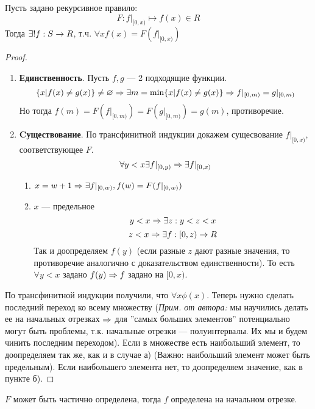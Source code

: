 \begin{theorem}
    Пусть задано рекурсивное правило:
    \[F: f|_{[0, x)} \mapsto f(x) \in R\]
    Тогда \(\exists! f: S \rightarrow R\), т.ч. \(\forall x f(x) = F(f|_{[0, x)})\)
\end{theorem}
\begin{proof}\indent
    \begin{enumerate}
        \item[] \textbf{Единственность}. Пусть \(f, g\) --- 2 подходящие функции.
        \[\{x | f(x) \ne g(x)\} \ne \varnothing \Rightarrow \exists m = \min\{x| f(x) \ne g(x)\} \Rightarrow f|_{[0, m)} = g|_{[0, m)}\]
        Но тогда \(f(m) = F(f|_{[0, m)}) = F(g|_{[0, m)}) = g(m)\), противоречие.

        \item[] \textbf{Cуществование}. По трансфинитной индукции докажем сущесвование \(f|_{[0, x)}\), соответствующее \(F\).
        \[\forall y < x \exists f|_{[0, y)} \Rightarrow \exists f|_{[0, x)}\]
        \begin{enumerate}
            \item \(x = w + 1 \Rightarrow \exists f|_{[0, w)}, f(w) = F(f|_{[0, w)})\)
            \item \(x\) --- предельное
            \[y < x \Rightarrow \exists z: y < z < x\]
            \[z < x \Rightarrow \exists f: [0, z) \rightarrow R\]
            Так и доопределяем \(f(y)\) (если разные \(z\) дают разные значения, то противоречие аналогично с доказательством единственности). То есть \(\forall y < x\) задано \(f(y) \Rightarrow f\) задано на \([0, x)\).
        \end{enumerate}
    \end{enumerate}
    По трансфинитной индукции получили, что \(\forall x \phi(x)\). 
    Теперь нужно сделать последний переход ко всему множеству (\textit{Прим. от автора:} мы научились делать ее на начальных отрезках \(\Rightarrow\) для ''самых больших элементов'' потенциально могут быть проблемы, т.к. начальные отрезки --- полуинтервалы. Их мы и будем чинить последним переходом). Если в множестве есть наибольший элемент, то доопределяем так же, как и в случае а) (Важно: наибольший элемент может быть предельным). Если наибольшего элемента нет, то доопределяем значение, как в пункте б).
\end{proof}
\begin{theorem}
    \(F\) может быть частично определена, тогда \(f\) определена на начальном отрезке.
\end{theorem}
